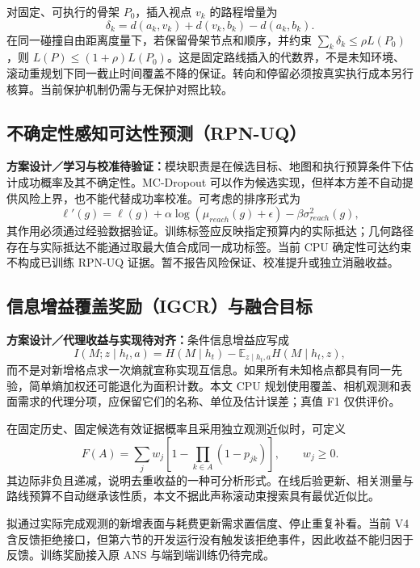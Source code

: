 \documentclass[11pt,a4paper]{article}
\begin{document}
对固定、可执行的骨架 $P_0$，插入视点 $v_k$ 的路程增量为
\begin{equation}
 \delta_k=d(a_k,v_k)+d(v_k,b_k)-d(a_k,b_k).
\end{equation}
在同一碰撞自由距离度量下，若保留骨架节点和顺序，并约束 $\sum_k\delta_k\le\rho L(P_0)$，则 $L(P)\le(1+\rho)L(P_0)$。这是固定路线插入的代数界，不是未知环境、滚动重规划下同一截止时间覆盖不降的保证。转向和停留必须按真实执行成本另行核算。当前保护机制仍需与无保护对照比较。

\subsection{不确定性感知可达性预测（RPN-UQ）}
\label{sec:rpn}
\textbf{方案设计／学习与校准待验证：}模块职责是在候选目标、地图和执行预算条件下估计成功概率及其不确定性。MC-Dropout 可以作为候选实现，但样本方差不自动提供风险上界，也不能代替成功率校准。可考虑的排序形式为
\begin{equation}
 \ell'(g)=\ell(g)+\alpha\log(\mu_{reach}(g)+\epsilon)-\beta\sigma^2_{reach}(g),
\end{equation}
其作用必须通过经验数据验证。训练标签应反映指定预算内的实际抵达；几何路径存在与实际抵达不能通过取最大值合成同一成功标签。当前 CPU 确定性可达约束不构成已训练 RPN-UQ 证据。暂不报告风险保证、校准提升或独立消融收益。

\subsection{信息增益覆盖奖励（IGCR）与融合目标}
\label{sec:reward}
\textbf{方案设计／代理收益与实现待对齐：}条件信息增益应写成
\begin{equation}
 I(M;z\mid h_t,a)=H(M\mid h_t)-\mathbb E_{z\mid h_t,a}H(M\mid h_t,z),
\end{equation}
而不是对新增格点求一次熵就宣称实现互信息。如果所有未知格点都具有同一先验，简单熵加权还可能退化为面积计数。本文 CPU 规划使用覆盖、相机观测和表面需求的代理分项，应保留它们的名称、单位及估计误差；真值 F1 仅供评价。

在固定历史、固定候选有效证据概率且采用独立观测近似时，可定义
\begin{equation}
 F(A)=\sum_jw_j\left[1-\prod_{k\in A}(1-p_{jk})\right],\qquad w_j\ge0.
\end{equation}
其边际非负且递减，说明去重收益的一种可分析形式。在线后验更新、相关测量与路线预算不自动继承该性质，本文不据此声称滚动束搜索具有最优近似比。

拟通过实际完成观测的新增表面与耗费更新需求置信度、停止重复补看。当前 V4 含反馈拒绝接口，但第六节的开发运行没有触发该拒绝事件，因此收益不能归因于反馈。训练奖励接入原 ANS 与端到端训练仍待完成。
\end{document}
